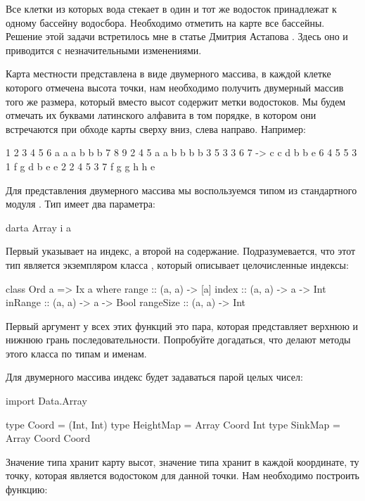 Все клетки из которых вода стекает в один и тот же
водосток принадлежат к одному бассейну водосбора. 
Необходимо отметить на карте все бассейны. Решение
этой задачи встретилось мне в статье Дмитрия Астапова
.
Здесь оно и приводится с незначительными изменениями.

Карта местности представлена в виде двумерного массива,
в каждой клетке которого отмечена высота точки,
нам необходимо получить двумерный массив того же размера,
который вместо высот содержит метки водостоков. Мы будем 
отмечать их буквами латинского алфавита в том порядке,
в котором они встречаются при обходе карты сверху вниз,
слева направо. Например:

\begin{code}
1 2 3 4 5 6       a a a b b b
7 8 9 2 4 5       a a b b b b
3 5 3 3 6 7   ->  c c d b b e 
6 4 5 5 3 1       f g d b e e
2 2 4 5 3 7       f g g h h e
\end{code}

Для представления двумерного массива мы воспользуемся
типом  из стандартного модуля .
Тип  имеет два параметра:

\begin{code}
darta Array i a
\end{code}

Первый указывает на индекс, а второй на содержание. 
Подразумевается, что этот тип является экземпляром
класса , который описывает целочисленные индексы:

\begin{code}
class Ord a => Ix a where
    range :: (a, a) -> [a]
    index :: (a, a) -> a -> Int
    inRange :: (a, a) -> a -> Bool
    rangeSize :: (a, a) -> Int
\end{code}

Первый аргумент у всех этих функций это пара, которая 
представляет верхнюю и нижнюю грань последовательности. 
Попробуйте догадаться, что делают методы этого класса 
по типам и именам.

Для двумерного массива индекс будет задаваться парой целых
чисел:

\begin{code}
import Data.Array

type Coord = (Int, Int)
type HeightMap = Array Coord Int
type SinkMap   = Array Coord Coord
\end{code}

Значение типа  хранит карту высот, 
значение типа  хранит в каждой координате,
ту точку, которая является водостоком для данной точки.
Нам необходимо построить функцию:

